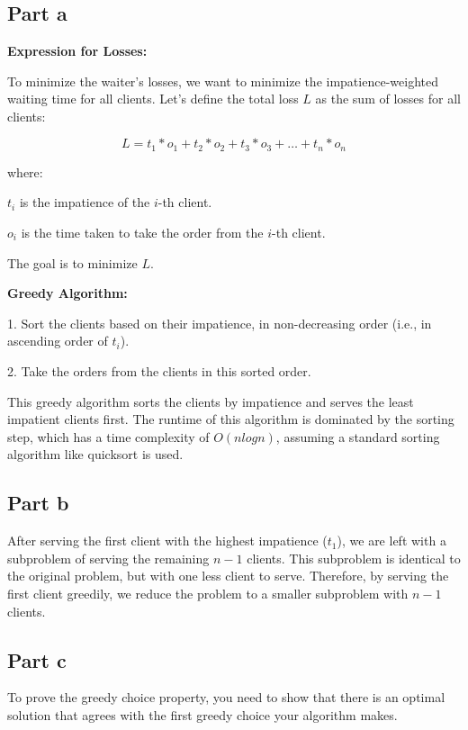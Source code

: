 \section{}
\subsection*{Part a}
\textbf{Expression for Losses:}

To minimize the waiter's losses, we want to minimize the impatience-weighted waiting time for all clients. Let's define the total loss $L$ as the sum of losses for all clients:

\[L = t_1 * o_1 + t_2 * o_2 + t_3 * o_3 + \dots + t_n * o_n  \]

where:

$t_i$ is the impatience of the $i$-th client.

$o_i$ is the time taken to take the order from the $i$-th client.

The goal is to minimize $L$.

\textbf{Greedy Algorithm:}

1. Sort the clients based on their impatience, in non-decreasing order (i.e., in ascending order of $t_i$).

2. Take the orders from the clients in this sorted order.

This greedy algorithm sorts the clients by impatience and serves the least impatient clients first. The runtime of this algorithm is dominated by the sorting step, which has a time complexity of $O(n log n)$, assuming a standard sorting algorithm like quicksort is used.

\subsection*{Part b}
After serving the first client with the highest impatience ($t_1$), we are left with a subproblem of serving the remaining $n-1$ clients. This subproblem is identical to the original problem, but with one less client to serve. Therefore, by serving the first client greedily, we reduce the problem to a smaller subproblem with $n-1$ clients.

\subsection*{Part c}
To prove the greedy choice property, you need to show that there is an optimal solution that agrees with the first greedy choice your algorithm makes.

